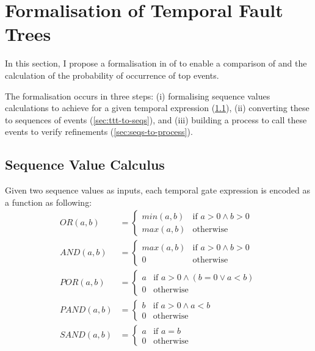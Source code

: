 \section{Formalisation of Temporal Fault Trees}
\label{sec:tft-formalisation}

In this section, I propose a formalisation in \CSP of \TFT to enable a comparison of \TFTs and the calculation of the probability of occurrence of top events.

The formalisation occurs in three steps: (i) formalising sequence values calculations to achieve \TTTs for a given temporal expression (\cref{sec:sv-calculus}), (ii) converting these \TTTs to sequences of events (\cref{sec:ttt-to-seqs}), and (iii) building a process to call these events to verify refinements (\cref{sec:seqs-to-process}).

\subsection{Sequence Value Calculus}
\label{sec:sv-calculus}

Given two sequence values as inputs, each temporal gate expression is encoded as a \CSP function as following:
\begin{align}
OR(a,b) & = 
  \begin{cases}
  min(a,b) & \text{if } a > 0 \land b > 0\\
  max(a,b) & \text{otherwise}
  \end{cases}\\
AND(a,b) & =
  \begin{cases}
  max(a,b) & \text{if } a > 0 \land b > 0\\
  0 & \text{otherwise}
  \end{cases}\\ 
POR(a,b) & =
  \begin{cases}
  a & \text{if } a > 0 \land (b = 0 \lor a < b)\\
  0 & \text{otherwise}
  \end{cases}\\ 
PAND(a,b) & =
  \begin{cases}
  b & \text{if } a > 0 \land a < b\\
  0 & \text{otherwise}
  \end{cases}\\ 
SAND(a,b) & =
  \begin{cases}
  a & \text{if } a = b\\
  0 & \text{otherwise}
  \end{cases}
\end{align}

